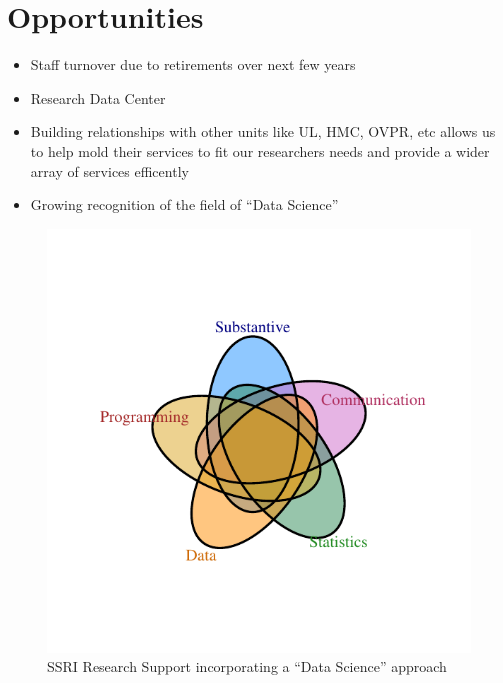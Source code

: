 \documentclass{article}
\begin{document}
\section*{Opportunities}
\begin{itemize}
  \item Staff turnover due to retirements over next few years
  \item Research Data Center 
  \item Building relationships with other units like UL, HMC, OVPR, etc allows us to help mold their services to fit our researchers needs and provide a wider array of services efficently  
  \item Growing recognition of the field of ``Data Science'' 
\end{itemize}


\begin{figure}[h]
\begin{center}
\includegraphics{vennDiagram-002}

\caption{SSRI Research Support incorporating a ``Data Science'' approach}
\end{center}
\end{figure}
\end{document}
